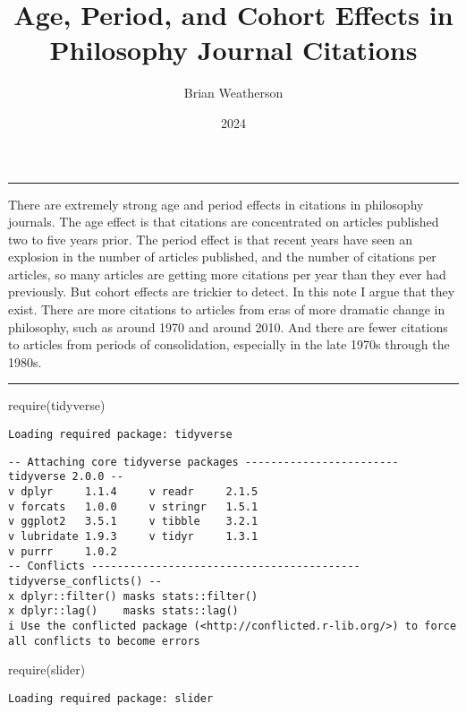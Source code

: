 \documentclass[
  10pt,
  letterpaper,
  DIV=11,
  numbers=noendperiod,
  twoside]{scrartcl}
\title{Age, Period, and Cohort Effects in Philosophy Journal Citations}
\author{Brian Weatherson}
\date{2024}
\newenvironment{Shaded}{\begin{snugshade}}{\end{snugshade}}
\newcommand{\FunctionTok}[1]{\textcolor[rgb]{0.28,0.35,0.67}{#1}}
\newcommand{\NormalTok}[1]{\textcolor[rgb]{0.00,0.23,0.31}{#1}}
\renewenvironment{abstract}
 {\vspace{-1.25cm}
 \quotation\small\noindent\rule{\linewidth}{.5pt}\par\smallskip
 \noindent }
 {\par\noindent\rule{\linewidth}{.5pt}\endquotation}
\begin{document}
\maketitle
\begin{abstract}
There are extremely strong age and period effects in citations in
philosophy journals. The age effect is that citations are concentrated
on articles published two to five years prior. The period effect is that
recent years have seen an explosion in the number of articles published,
and the number of citations per articles, so many articles are getting
more citations per year than they ever had previously. But cohort
effects are trickier to detect. In this note I argue that they exist.
There are more citations to articles from eras of more dramatic change
in philosophy, such as around 1970 and around 2010. And there are fewer
citations to articles from periods of consolidation, especially in the
late 1970s through the 1980s.
\end{abstract}

\begin{Shaded}
\begin{Highlighting}[]
\FunctionTok{require}\NormalTok{(tidyverse)}
\end{Highlighting}
\end{Shaded}

\begin{verbatim}
Loading required package: tidyverse
\end{verbatim}

\begin{verbatim}
-- Attaching core tidyverse packages ------------------------ tidyverse 2.0.0 --
v dplyr     1.1.4     v readr     2.1.5
v forcats   1.0.0     v stringr   1.5.1
v ggplot2   3.5.1     v tibble    3.2.1
v lubridate 1.9.3     v tidyr     1.3.1
v purrr     1.0.2     
-- Conflicts ------------------------------------------ tidyverse_conflicts() --
x dplyr::filter() masks stats::filter()
x dplyr::lag()    masks stats::lag()
i Use the conflicted package (<http://conflicted.r-lib.org/>) to force all conflicts to become errors
\end{verbatim}

\begin{Shaded}
\begin{Highlighting}[]
\FunctionTok{require}\NormalTok{(slider)}
\end{Highlighting}
\end{Shaded}

\begin{verbatim}
Loading required package: slider
\end{verbatim}
\end{document}

